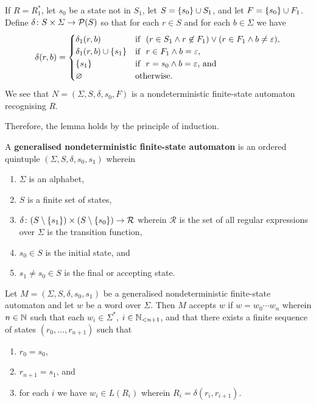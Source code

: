     If \(R = R_1^*\), let \(s_0\) be a state not in \(S_1\), let \(S = \set{s_0}
    \cup S_1\), and let \(F = \set{s_0} \cup F_1\). Define \(\map{\delta}{S
    \times \varSigma}{\pow(S)}\) so that for each \(r \in S\) and for each \(b
    \in \varSigma\) we have
    \[
        \delta(r, b) = \begin{cases}
            \delta_1(r, b) & \text{if }\ (r \in S_1 \land r \not\in F_1) \lor (r
            \in F_1 \land b \neq \varepsilon),\\
            \delta_1(r, b) \cup \set{s_1} & \text{if }\ r \in F_1 \land b =
            \varepsilon,\\
            \set{s_1} & \text{if }\ r = s_0 \land b = \varepsilon \text{, and}\\
            \nset & \text{otherwise.}
        \end{cases}
    \]
    We see that \(N = (\varSigma, S, \delta, s_0, F)\) is a nondeterministic
    finite-state automaton recognising \(R\).

    Therefore, the lemma holds by the principle of induction.
\Epr

\Bdf
    A {\bf generalised nondeterministic finite-state automaton} is an ordered
    quintuple \((\varSigma, S, \delta, s_0, s_1)\) wherein
    \begin{enumerate}
        \item \(\varSigma\) is an alphabet,
        \item \(S\) is a finite set of states,
        \item \(\map{\delta}{(S \setminus \set{s_1}) \times (S \setminus
        \set{s_0})}{\mathcal{R}}\) wherein \(\mathcal{R}\) is the set of all
        regular expressions over \(\varSigma\) is the transition function,
        \item \(s_0 \in S\) is the initial state, and
        \item \(s_1 \neq s_0 \in S\) is the final or accepting state.
    \end{enumerate}
\Edf

Let \(M = (\varSigma, S, \delta, s_0, s_1)\) be a generalised nondeterministic
finite-state automaton and let \(w\) be a word over \(\varSigma\). Then \(M\)
accepts \(w\) if \(w = w_0 \cdots w_n\) wherein \(n \in \setnat\) such that each
\(w_i \in \varSigma^*\), \(i \in \Nln[n + 1]\), and that there exists a finite
sequence of states \((r_0, \ldots, r_{n + 1})\) such that
\begin{enumerate}
    \item \(r_0 = s_0\),
    \item \(r_{n + 1} = s_1\), and
    \item for each \(i\) we have \(w_i \in L(R_i)\) wherein \(R_i = \delta(r_i,
    r_{i + 1})\).
\end{enumerate}

